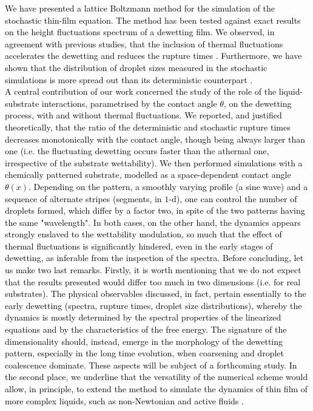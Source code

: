 \textcolor{black}{We have presented a lattice Boltzmann method for the simulation of the stochastic thin-film equation. 
The method has been tested against exact results on the height fluctuations spectrum of a dewetting film.  
We observed, in agreement with previous studies, that the inclusion of thermal fluctuations accelerates the dewetting and reduces 
the rupture times \cite{grunThinFilmFlowInfluenced2006}.
Furthermore, we have shown that the distribution of droplet sizes measured in the stochastic simulations 
is more spread out than its deterministic counterpart \cite{nesicFullyNonlinearDynamics2015}. \\
A central contribution of our work concerned the study of the role of the liquid-substrate interactions, parametrised by the contact angle $\theta$, on the dewetting process, with and without thermal fluctuations.}
\textcolor{black}{We reported, and justified theoretically, that the ratio of the deterministic and stochastic rupture times
decreases monotonically with the contact angle, though being always larger than one
(i.e. the fluctuating dewetting occurs faster than the athermal one, irrespective of the substrate wettability).  
We then performed simulations with a chemically patterned substrate, modelled as a space-dependent contact angle $\theta(x)$. 
Depending on the pattern, a smoothly varying profile (a sine wave) and a sequence of
alternate stripes (segments, in $1$-d), one can control the number of droplets formed,
which differ by a factor two, in spite of the two patterns having the same "wavelength".
In both cases, on the other hand, the dynamics appears strongly enslaved to the wettability 
modulation, so much that the effect of thermal fluctuations is significantly hindered, 
even in the early stages of dewetting, as inferable from the inspection of the spectra.
Before concluding, let us make two last remarks. Firstly, it is worth mentioning that we do not 
expect that the results presented would differ too much in two dimensions (i.e. for real substrates).
The physical observables discussed, in fact, pertain essentially to the early dewetting (spectra, rupture times, droplet size distributions),
whereby the dynamics is mostly determined by the spectral properties of the linearized equations and by the characteristics of the free energy.
The signature of the dimensionality should, instead, emerge in the morphology of the dewetting pattern, especially in the long time evolution,
when coarsening and droplet coalescence dominate. These aspects will be subject of a forthcoming study. 
In the second place, we underline that the versatility of the numerical scheme would allow, in principle, to extend the method to simulate
the dynamics of thin film of more complex liquids, such as non-Newtonian and active fluids \cite{Eggers1997,Carenza2019}.
}

